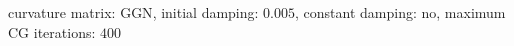 curvature matrix: $\text{GGN}$, initial damping: $\num[scientific-notation=true]{0.005}$, constant damping: $\text{no}$, maximum CG iterations: $\num[scientific-notation=false]{400}$